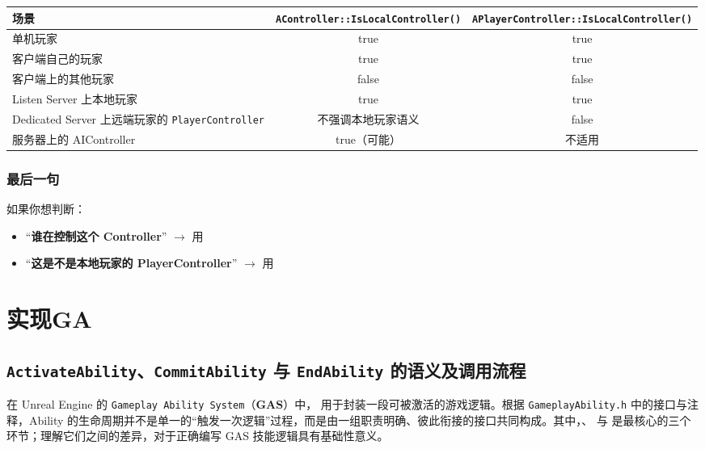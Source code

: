 \begin{center}\footnotesize
	\renewcommand{\arraystretch}{1.5}
	\begin{tabular}{|p{4.8cm}|c|c|}
		\hline
		\textbf{场景} & \texttt{AController::IsLocalController()} & \texttt{APlayerController::IsLocalController()} \\
		\hline
		单机玩家 & true & true \\
		\hline
		客户端自己的玩家 & true & true \\
		\hline
		客户端上的其他玩家 & false & false \\
		\hline
		Listen Server 上本地玩家 & true & true \\
		\hline
		Dedicated Server 上远端玩家的 \texttt{PlayerController} & 不强调本地玩家语义 & false \\
		\hline
		服务器上的 AIController & true（可能） & 不适用 \\
		\hline
	\end{tabular}
\end{center}

\subsection{最后一句}

如果你想判断：

\begin{itemize}
	\item “\textbf{谁在控制这个 Controller}” $\rightarrow$ 用 
	\item “\textbf{这是不是本地玩家的 PlayerController}” $\rightarrow$ 用 
\end{itemize}

\chapter{实现GA}

\section{\texttt{ActivateAbility}、\texttt{CommitAbility} 与 \texttt{EndAbility} 的语义及调用流程}

在 Unreal Engine 的 \texttt{Gameplay Ability System}（\textbf{GAS}）中， 用于封装一段可被激活的游戏逻辑。根据 \texttt{GameplayAbility.h} 中的接口与注释，Ability 的生命周期并不是单一的“触发一次逻辑”过程，而是由一组职责明确、彼此衔接的接口共同构成。其中，、 与  是最核心的三个环节；理解它们之间的差异，对于正确编写 GAS 技能逻辑具有基础性意义。

